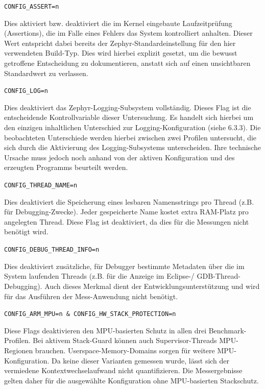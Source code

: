 \lstinline[style=codeinline]|CONFIG_ASSERT=n|

Dies aktiviert bzw. deaktiviert die im Kernel eingebaute Laufzeitpr{\"u}fung (Assertions), die im Falle eines Fehlers das System kontrolliert anhalten. Dieser Wert entspricht dabei bereits der Zephyr-Standardeinstellung f{\"u}r den hier verwendeten Build-Typ. Dies wird hierbei explizit gesetzt, um die bewusst getroffene Entscheidung zu dokumentieren, anstatt sich auf einen unsichtbaren Standardwert zu verlassen.

\lstinline[style=codeinline]|CONFIG_LOG=n|

Dies deaktiviert das Zephyr-Logging-Subsystem vollst{\"a}ndig. Dieses Flag ist die entscheidende Kontrollvariable dieser Untersuchung. Es handelt sich hierbei um den einzigen inhaltlichen Unterschied zur Logging-Konfiguration (siehe 6.3.3). Die beobachteten Unterschiede werden hierbei zwischen zwei Profilen untersucht, die sich durch die Aktivierung des Logging-Subsystems unterscheiden. Ihre technische Ursache muss jedoch noch anhand von der aktiven Konfiguration und des erzeugten Programms beurteilt werden.

\lstinline[style=codeinline]|CONFIG_THREAD_NAME=n|

Dies deaktiviert die Speicherung eines lesbaren Namensstrings pro Thread (z.B. f{\"u}r Debugging-Zwecke). Jeder gespeicherte Name kostet extra RAM-Platz pro angelegten Thread. Diese Flag ist deaktiviert, da dies f{\"u}r die Messungen nicht ben{\"o}tigt wird.

\lstinline[style=codeinline]|CONFIG_DEBUG_THREAD_INFO=n|

Dies deaktiviert zus{\"a}tzliche, f{\"u}r Debugger bestimmte Metadaten {\"u}ber die im System laufenden Threads (z.B. f{\"u}r die Anzeige im Eclipse-/ GDB-Thread-Debugging). Auch dieses Merkmal dient der Entwicklungsunterst{\"u}tzung und wird f{\"u}r das Ausf{\"u}hren der Mess-Anwendung nicht ben{\"o}tigt.

\lstinline[style=codeinline]|CONFIG_ARM_MPU=n & CONFIG_HW_STACK_PROTECTION=n|

Diese Flags deaktivieren den MPU-basierten Schutz in allen drei Benchmark-Profilen. Bei aktivem Stack-Guard k{\"o}nnen auch Supervisor-Threads MPU-Regionen brauchen. Userspace-Memory-Domains sorgen f{\"u}r weitere MPU-Konfiguration. Da keine dieser Varianten gemessen wurde, l{\"a}sst sich der vermiedene Kontextwechselaufwand nicht quantifizieren. Die Messergebnisse gelten daher f{\"u}r die ausgew{\"a}hlte Konfiguration ohne MPU-basierten Stackschutz.

